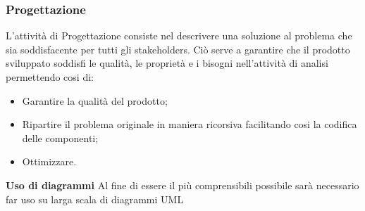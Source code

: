 	    \subsubsection{Progettazione}
	    L'attività di Progettazione consiste nel descrivere una soluzione al problema che sia soddisfacente per tutti gli stakeholders\pedice. Ciò serve a garantire che il prodotto sviluppato soddisfi le qualità, le proprietà e i bisogni nell'attività di analisi permettendo cosi di:
	    \begin{itemize}
	        \item Garantire la qualità del prodotto;
	        \item Ripartire il problema originale in maniera ricorsiva facilitando cosi la codifica delle componenti;
	        \item Ottimizzare.
	    \end{itemize}	
	    \textbf{Uso di diagrammi} Al fine di essere il più comprensibili possibile sarà necessario far uso su larga scala di diagrammi UML
